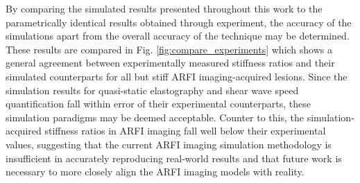 			By comparing the simulated results presented throughout this work to the parametrically identical results obtained through experiment, the accuracy of the simulations apart from the overall accuracy of the technique may be determined. These results are compared in Fig. \ref{fig:compare_experiments} which shows a general agreement between experimentally measured stiffness ratios and their simulated counterparts for all but stiff ARFI imaging-acquired lesions. Since the simulation results for quasi-static elastography and shear wave speed quantification fall within error of their experimental counterparts, these simulation paradigms may be deemed acceptable. Counter to this, the simulation-acquired stiffness ratios in ARFI imaging fall well below their experimental values, suggesting that the current ARFI imaging simulation methodology is insufficient in accurately reproducing real-world results and that future work is necessary to more closely align the ARFI imaging models with reality.


